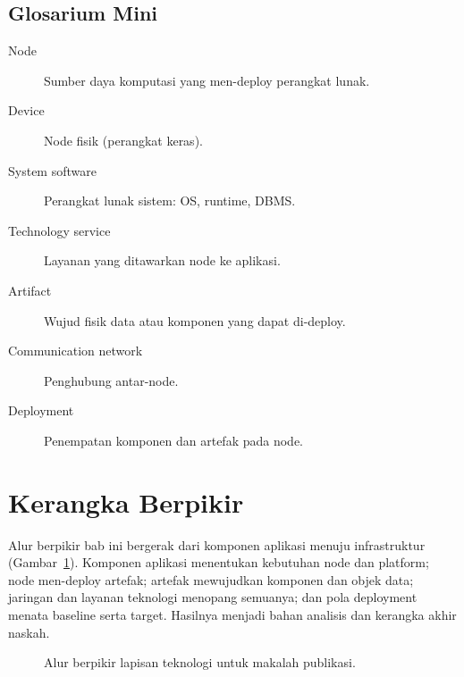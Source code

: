 \subsection*{Glosarium Mini}
\begin{description}
  \item[Node] Sumber daya komputasi yang men-deploy perangkat lunak.
  \item[Device] Node fisik (perangkat keras).
  \item[System software] Perangkat lunak sistem: OS, runtime, DBMS.
  \item[Technology service] Layanan yang ditawarkan node ke aplikasi.
  \item[Artifact] Wujud fisik data atau komponen yang dapat di-deploy.
  \item[Communication network] Penghubung antar-node.
  \item[Deployment] Penempatan komponen dan artefak pada node.
\end{description}

\section{Kerangka Berpikir}

Alur berpikir bab ini bergerak dari komponen aplikasi menuju infrastruktur
(Gambar~\ref{fig:tech-flow}). Komponen aplikasi menentukan kebutuhan node dan
platform; node men-deploy artefak; artefak mewujudkan komponen dan objek data;
jaringan dan layanan teknologi menopang semuanya; dan pola deployment menata
baseline serta target. Hasilnya menjadi bahan analisis dan kerangka akhir naskah.

\begin{figure}[htbp]
\centering
{}
\caption{Alur berpikir lapisan teknologi untuk makalah publikasi.}
\label{fig:tech-flow}
\end{figure}

